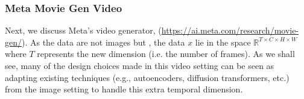 
\subsubsection{Meta Movie Gen Video}
Next, we discuss Meta's video generator,  (\url{https://ai.meta.com/research/movie-gen/}). As the data are not images but ,  the data $x$ lie in the space $\mathbb{R}^{T \times C \times H \times W}$ where $T$ represents the new  dimension (i.e. the number of frames). As we shall see, many of the design choices made in this video setting can be seen as adapting existing techniques (e.g., autoencoders, diffusion transformers, etc.) from the image setting to handle this extra temporal dimension.\\

